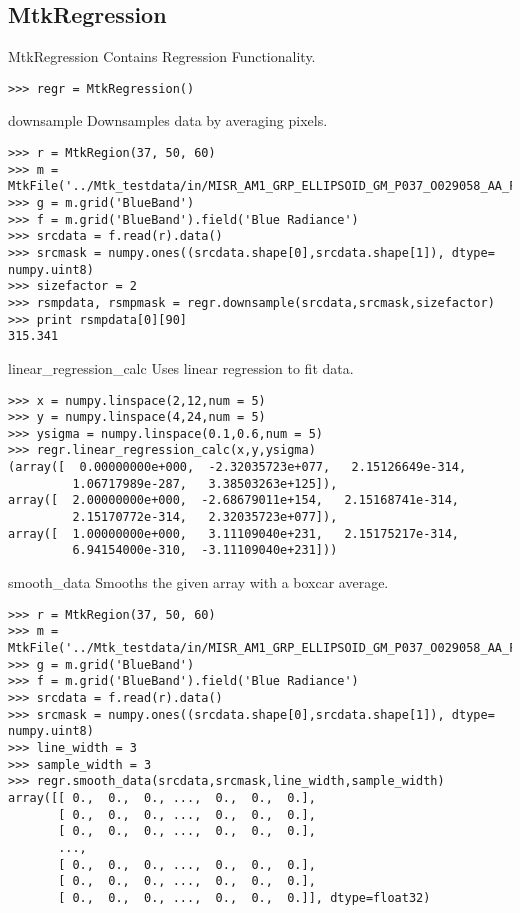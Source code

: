 \documentclass{howto}
\begin{document}
\subsection{MtkRegression \label{mtkregression}}

\begin{classdesc*}{MtkRegression}
  Contains Regression Functionality.

\begin{verbatim}
>>> regr = MtkRegression()
\end{verbatim}
\end{classdesc*}

\begin{methoddesc}{downsample}{}
    Downsamples data by averaging pixels.

\begin{verbatim}
>>> r = MtkRegion(37, 50, 60)
>>> m = MtkFile('../Mtk_testdata/in/MISR_AM1_GRP_ELLIPSOID_GM_P037_O029058_AA_F03_0024.hdf')
>>> g = m.grid('BlueBand')
>>> f = m.grid('BlueBand').field('Blue Radiance')
>>> srcdata = f.read(r).data()
>>> srcmask = numpy.ones((srcdata.shape[0],srcdata.shape[1]), dtype= numpy.uint8)
>>> sizefactor = 2
>>> rsmpdata, rsmpmask = regr.downsample(srcdata,srcmask,sizefactor)
>>> print rsmpdata[0][90]
315.341
\end{verbatim}
\end{methoddesc}

\begin{methoddesc}{linear_regression_calc}{}
    Uses linear regression to fit data.

\begin{verbatim}
>>> x = numpy.linspace(2,12,num = 5)
>>> y = numpy.linspace(4,24,num = 5)
>>> ysigma = numpy.linspace(0.1,0.6,num = 5)
>>> regr.linear_regression_calc(x,y,ysigma)
(array([  0.00000000e+000,  -2.32035723e+077,   2.15126649e-314,
         1.06717989e-287,   3.38503263e+125]), 
array([  2.00000000e+000,  -2.68679011e+154,   2.15168741e-314,
         2.15170772e-314,   2.32035723e+077]), 
array([  1.00000000e+000,   3.11109040e+231,   2.15175217e-314,
         6.94154000e-310,  -3.11109040e+231]))
\end{verbatim}
\end{methoddesc}

\begin{methoddesc}{smooth_data}{}
    Smooths the given array with a boxcar average.

\begin{verbatim}
>>> r = MtkRegion(37, 50, 60)
>>> m = MtkFile('../Mtk_testdata/in/MISR_AM1_GRP_ELLIPSOID_GM_P037_O029058_AA_F03_0024.hdf')
>>> g = m.grid('BlueBand')
>>> f = m.grid('BlueBand').field('Blue Radiance')
>>> srcdata = f.read(r).data()
>>> srcmask = numpy.ones((srcdata.shape[0],srcdata.shape[1]), dtype= numpy.uint8)
>>> line_width = 3
>>> sample_width = 3
>>> regr.smooth_data(srcdata,srcmask,line_width,sample_width)
array([[ 0.,  0.,  0., ...,  0.,  0.,  0.],
       [ 0.,  0.,  0., ...,  0.,  0.,  0.],
       [ 0.,  0.,  0., ...,  0.,  0.,  0.],
       ...,
       [ 0.,  0.,  0., ...,  0.,  0.,  0.],
       [ 0.,  0.,  0., ...,  0.,  0.,  0.],
       [ 0.,  0.,  0., ...,  0.,  0.,  0.]], dtype=float32)
\end{verbatim}
\end{methoddesc} 
\end{document}
